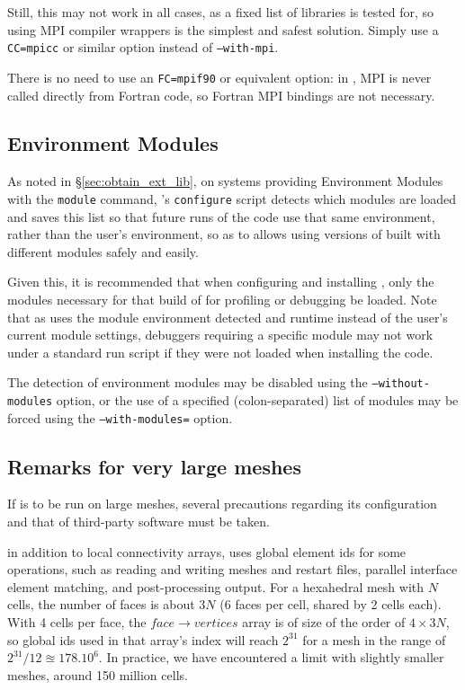 \documentclass[a4paper,10pt,twoside]{csshortdoc}
\begin{document}
Still, this may not work in all cases, as a fixed list of libraries
is tested for, so using MPI compiler wrappers is the simplest and safest
solution. Simply use a \texttt{CC=mpicc} or similar option instead
of \texttt{--with-mpi}.

There is no need to use an \texttt{FC=mpif90} or equivalent option:
in \CS, MPI is never called directly from Fortran code,
so Fortran MPI bindings are not necessary.

\subsection{Environment Modules\label{sec:config:envmode}}

As noted in \S\ref{sec:obtain_ext_lib}, on systems providing
Environment Modules with the {\tt module} command, \CS's {\tt configure}
script detects which modules are loaded and saves
this list so that future runs of the code use that same environment,
rather than the user's environment, so as to allows using versions of
\CS built with different modules safely and easily.

Given this, it is recommended that when configuring and installing
\CS, only the modules necessary for that build of for
profiling or debugging be loaded. Note that as \CS uses the module
environment detected and runtime instead of the user's current
module settings, debuggers requiring a specific module may
not work under a standard run script if they were not loaded when
installing the code.

The detection of environment modules may be disabled using the
\texttt{--without-modules} option,
or the use of a specified (colon-separated) list of modules
may be forced using the \texttt{--with-modules=} option.

\subsection{Remarks for very large meshes\label{sec:config:largemesh}}

If \CS is to be run on large meshes, several precautions regarding
its configuration and that of third-party software must be taken.

in addition to local connectivity arrays, \CS uses global element ids
for some operations, such as reading and writing meshes and restart files,
parallel interface element matching, and post-processing output.
For a hexahedral mesh with $N$ cells,
the number of faces is about $3N$ (6 faces per cell, shared by 2 cells each).
With 4 cells per face, the $face \rightarrow vertices$ array is of size
of the order of $4\times3N$, so global ids used in that array's index
will reach $2^{31}$ for a mesh in the range of $2^{31} / 12 \approxeq 178.10^6$.
In practice, we have encountered a limit with slightly smaller meshes,
around 150 million cells.
\end{document}
